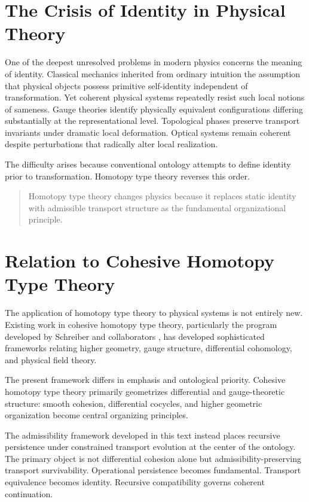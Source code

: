 \documentclass[11pt,openany]{book}
\theoremstyle{definition}
\theoremstyle{plain}
\begin{document}
\bigskip

\section{The Crisis of Identity in Physical Theory}

One of the deepest unresolved problems in modern physics concerns the meaning of identity. Classical mechanics inherited from ordinary intuition the assumption that physical objects possess primitive self-identity independent of transformation. Yet coherent physical systems repeatedly resist such local notions of sameness. Gauge theories identify physically equivalent configurations differing substantially at the representational level. Topological phases preserve transport invariants under dramatic local deformation. Optical systems remain coherent despite perturbations that radically alter local realization.

The difficulty arises because conventional ontology attempts to define identity prior to transformation. Homotopy type theory reverses this order.

\begin{quote}
Homotopy type theory changes physics because it replaces static identity with admissible transport structure as the fundamental organizational principle.
\end{quote}

\section{Relation to Cohesive Homotopy Type Theory}

The application of homotopy type theory to physical systems is not entirely new. Existing work in cohesive homotopy type theory, particularly the program developed by Schreiber and collaborators \cite{schreiber}, has developed sophisticated frameworks relating higher geometry, gauge structure, differential cohomology, and physical field theory.

The present framework differs in emphasis and ontological priority. Cohesive homotopy type theory primarily geometrizes differential and gauge-theoretic structure: smooth cohesion, differential cocycles, and higher geometric organization become central organizing principles.

The admissibility framework developed in this text instead places recursive persistence under constrained transport evolution at the center of the ontology. The primary object is not differential cohesion alone but admissibility-preserving transport survivability. Operational persistence becomes fundamental. Transport equivalence becomes identity. Recursive compatibility governs coherent continuation.
\end{document}
